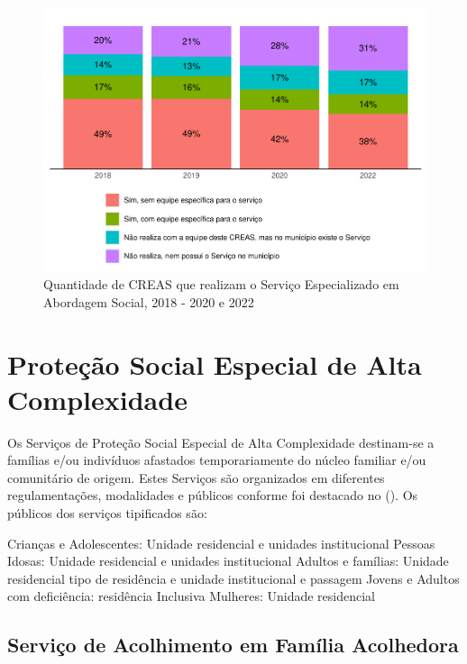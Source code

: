 \documentclass[
  brazilian]{report}
\begin{document}
\begin{figure}
\includegraphics{Censo-SUAS-2022_files/figure-latex/CREAS-abordagem-social-1} \caption[Quantidade de CREAS que realizam o Serviço Especializado em Abordagem Social, 2018 - 2020 e 2022]{Quantidade de CREAS que realizam o Serviço Especializado em Abordagem Social, 2018 - 2020 e 2022}\label{fig:CREAS-abordagem-social}
\end{figure}

\hypertarget{proteuxe7uxe3o-social-especial-de-alta-complexidade}{%
\section{Proteção Social Especial de Alta
Complexidade}\label{proteuxe7uxe3o-social-especial-de-alta-complexidade}}

Os Serviços de Proteção Social Especial de Alta Complexidade destinam-se
a famílias e/ou indivíduos afastados temporariamente do núcleo familiar
e/ou comunitário de origem. Estes Serviços são organizados em diferentes
regulamentações, modalidades e públicos conforme foi destacado no
(). Os públicos dos serviços tipificados são:

Crianças e Adolescentes: Unidade residencial e unidades institucional
Pessoas Idosas: Unidade residencial e unidades institucional Adultos e
famílias: Unidade residencial tipo de residência e unidade institucional
e passagem Jovens e Adultos com deficiência: residência Inclusiva
Mulheres: Unidade residencial

\hypertarget{serviuxe7o-de-acolhimento-em-famuxedlia-acolhedora}{%
\subsection{Serviço de Acolhimento em Família
Acolhedora}\label{serviuxe7o-de-acolhimento-em-famuxedlia-acolhedora}}
\end{document}

